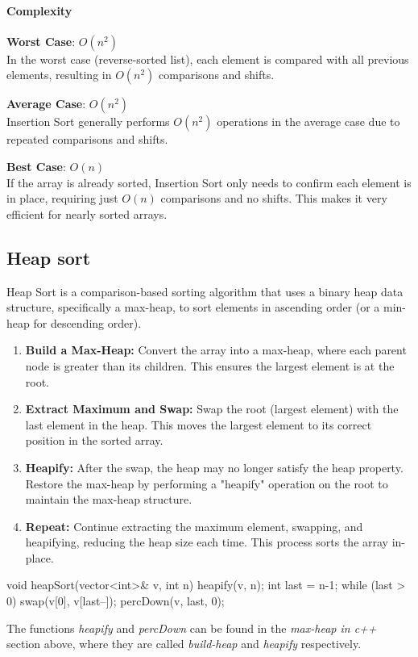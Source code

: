 \documentclass{report}
\begin{document}
\pagebreak 
\paragraph{Complexity}
\bigbreak \noindent \bigbreak \noindent 
\textbf{Worst Case}: \( O(n^2) \) \\
\bigbreak \noindent 
In the worst case (reverse-sorted list), each element is compared with all previous elements, resulting in \( O(n^2) \) comparisons and shifts.

\bigbreak \noindent 
\textbf{Average Case}: \( O(n^2) \) \\
\bigbreak \noindent 
Insertion Sort generally performs \( O(n^2) \) operations in the average case due to repeated comparisons and shifts.

\bigbreak \noindent 
\textbf{Best Case}: \( O(n) \) \\
\bigbreak \noindent 
If the array is already sorted, Insertion Sort only needs to confirm each element is in place, requiring just \( O(n) \) comparisons and no shifts. This makes it very efficient for nearly sorted arrays.







\pagebreak \bigbreak \noindent 
\subsection{Heap sort}
\bigbreak \noindent 
Heap Sort is a comparison-based sorting algorithm that uses a binary heap data structure, specifically a max-heap, to sort elements in ascending order (or a min-heap for descending order).
\bigbreak \noindent 
\begin{enumerate}
    \item \textbf{Build a Max-Heap:} Convert the array into a max-heap, where each parent node is greater than its children. This ensures the largest element is at the root.
    \item \textbf{Extract Maximum and Swap:} Swap the root (largest element) with the last element in the heap. This moves the largest element to its correct position in the sorted array.
    \item \textbf{Heapify:} After the swap, the heap may no longer satisfy the heap property. Restore the max-heap by performing a "heapify" operation on the root to maintain the max-heap structure.
    \item \textbf{Repeat:} Continue extracting the maximum element, swapping, and heapifying, reducing the heap size each time. This process sorts the array in-place.
\end{enumerate}
\bigbreak \noindent 
\begin{cppcode}
    void heapSort(vector<int>& v, int n) {
        heapify(v, n);
        int last = n-1;
        while (last > 0) {
            swap(v[0], v[last--]);
            percDown(v, last, 0);
        }
    }
\end{cppcode}
\bigbreak \noindent 
The functions \textit{heapify} and \textit{percDown} can be found in the \textit{max-heap in c++} section above, where they are called \textit{build-heap} and \textit{heapify} respectively.
\bigbreak \noindent 
\end{document}
